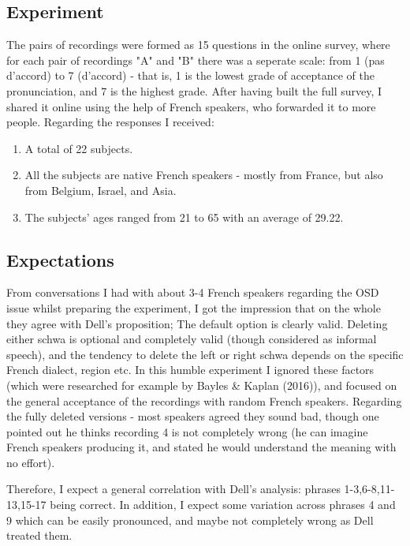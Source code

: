 \documentclass{article}
\begin{document}

\subsection{Experiment}
The pairs of recordings were formed as 15 questions in the online survey, where for each pair of recordings "A" and "B" there was a seperate scale: from 1 (pas d'accord) to 7 (d'accord) - that is, 1 is the lowest grade of acceptance of the pronunciation, and 7 is the highest grade. After having built the full survey,  I shared it online using the help of French speakers, who forwarded it to more people.  
Regarding the responses I received:
\begin{enumerate}
  \item A total of 22 subjects.
  \item All the subjects are native French speakers - mostly from France, but also from Belgium, Israel,  and Asia.
  \item The subjects’ ages ranged from 21 to 65 with an average of 29.22.
\end{enumerate}

\subsection{Expectations}
From conversations I had with about 3-4 French speakers regarding the OSD issue whilst preparing the experiment,  I got the impression that on the whole they agree with Dell's proposition; The default option is clearly valid. Deleting either schwa is optional and completely valid (though considered as informal speech), and the tendency to delete the left or right schwa depends on the specific French dialect, region etc. In this humble experiment I ignored these factors (which were researched for example by Bayles \& Kaplan (2016)), and focused on the general acceptance of the recordings with random French speakers. 
Regarding the fully deleted versions - most speakers agreed they sound bad, though one pointed out he thinks recording 4 is not completely wrong (he can imagine French speakers producing it, and stated he would understand the meaning with no effort). 

Therefore, I expect a general correlation with Dell's analysis: phrases 1-3,6-8,11-13,15-17 being correct. In addition, I expect some variation across phrases 4 and 9 which can be easily pronounced, and maybe not completely wrong as Dell treated them. 
\end{document}
